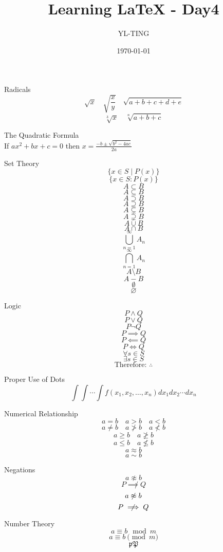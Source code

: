 \documentclass{article}
\author{YL-TING}
\title{Learning LaTeX - Day4}
\date{\today}
\begin{document}
    \maketitle
    \newpage

    {\Large Radicals}
    \[ \sqrt{x} \quad \sqrt{\frac{x}{y}} \quad \sqrt{a+b+c+d+e} \]
    \[ \sqrt[3]{x} \quad \sqrt[n]{a+b+c} \]

    {\Large The Quadratic Formula}\\
    If \( ax^2+bx+c = 0 \) then 
    \( \displaystyle x = \frac{-b \pm \sqrt{b^2 -4ac}}{2a} \)

    {\Large Set Theory}
    \[ \{ x \in S \mid P(x) \} \] 
    \[ \{ x \in S : P(x) \} \]
    \[ A \subset B \]
    \[ A \subseteq B \]
    \[ A \supset B \]
    \[ A \supseteq B \]
    \[ A \subsetneq B \]
    \[ A \supsetneq B \]
    \[ A \cup B \]
    \[ A \cap B \]
    \[ \bigcup_{n=1}^{\infty} A_n \]
    \[ \bigcap_{n=1}^{\infty} A_n \]
    \[ A \setminus B \]
    \[ A - B \]
    \[ \emptyset \]
    \[ \varnothing \]

    \newpage

    {\Large Logic}
    \[ P \land Q \]
    \[ P \lor Q \]
    \[ P \lnot Q \]
    \[ P \implies Q \]
    \[ P \impliedby Q \]
    \[ P \iff Q \]
    \[ \forall s \in S \]
    \[ \exists s \in S \]
    \[ \text{Therefore: } \therefore \]

    {\Large Proper Use of Dots}
    \[ \int \int \cdots \int f(x_1,x_2, \ldots ,x_n) dx_1 dx_2 \cdots dx_n \]

    {\Large Numerical Relationship}
    \[ a = b \quad a > b \quad a < b \] %
    \[ a \neq b \quad a \ngtr b \quad a \nless b \]
    \[a \geq b \quad a \ngeq b \]
    \[a \leq b \quad a \nleq b \]
    \[a \approx b\]
    \[a \sim b \]

    {\Large Negations}
    \[a \not \approx b\]
    \[P \not \implies Q\]
    \[a \centernot \approx b\]
    \[P \centernot \implies Q\]

    {\Large Number Theory}
    \[a \equiv b \mod{m}\]
    \[a \equiv b \pmod{m}\]
    \[ \mathfrak{p} \mathfrak{P} \]
\end{document}
